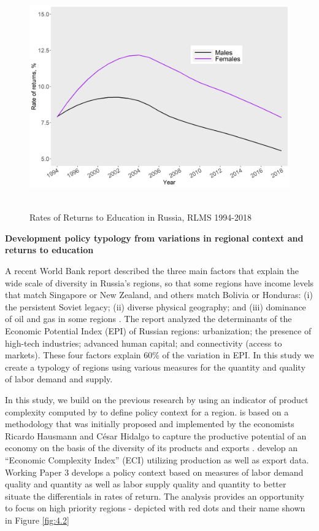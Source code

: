 \documentclass[alpha-refs]{wiley-article-04t}
\begin{document}
\begin{figure}[htbp!]
	\centering
	\includegraphics[width=\textwidth, height=275pt]{re_edu2.png}
	\caption{Rates of Returns to Education in Russia, RLMS 
	1994-2018}\label{fig:1.2}
\end{figure}


\hspace{-1.75em} \textbf{Development policy typology from variations in 
regional context and returns to education}

A recent World Bank report described the three main factors that explain 
the wide scale of diversity in Russia's regions, so that some regions 
have income levels that match Singapore or New Zealand, and others match 
Bolivia or Honduras: (i) the persistent Soviet legacy; (ii) diverse 
physical geography; and (iii) dominance of oil and gas in some regions 
\parencite{worldbank2018}. The report analyzed the determinants of the 
Economic Potential Index (EPI) of Russian regions: urbanization; the 
presence of high-tech industries; advanced human capital; 
and connectivity (access to markets). These four factors explain 60\% of 
the variation in EPI. In this study we create a typology of regions using 
various measures for the quantity and quality of labor demand and supply. 


In this study, we build on the previous research by using an indicator of 
product complexity computed by \cite{lyubimov2018} to define policy context 
for a region. \cite{lyubimov2018} is based on 
a methodology that was initially proposed and implemented by the economists 
Ricardo Hausmann and C\'esar Hidalgo to capture the productive potential 
of an economy on the basis of the diversity of its products and exports 
\parencite{hausmann2011, hausmann2014}. \cite{lyubimov2018} develop an 
``Economic Complexity Index'' (ECI) utilizing production as well as export 
data. Working Paper 3 develops a policy context based on measures of labor 
demand quality and quantity as well as labor supply quality and quantity to 
better situate the differentials in rates of return. The analysis provides 
an opportunity to focus on high priority regions - depicted with red dots 
and their name shown in Figure \ref{fig:4.2}
\end{document}
